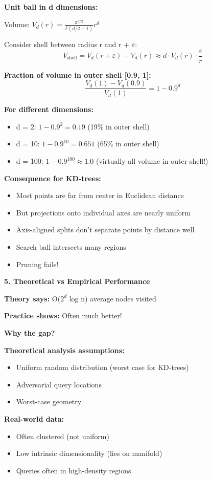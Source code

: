 \documentclass[12pt]{article}
\begin{document}
\begin{explanation}
\textbf{Unit ball in d dimensions:}

Volume: $V_d(r) = \frac{\pi^{d/2}}{\Gamma(d/2+1)} r^d$

Consider shell between radius r and r + $\varepsilon$:
\[
V_{\text{shell}} = V_d(r+\varepsilon) - V_d(r) \approx d \cdot V_d(r) \cdot \frac{\varepsilon}{r}
\]

\textbf{Fraction of volume in outer shell [0.9, 1]:}
\[
\frac{V_d(1) - V_d(0.9)}{V_d(1)} = 1 - 0.9^d
\]

\textbf{For different dimensions:}
\begin{itemize}
    \item d = 2: $1 - 0.9^2 = 0.19$ (19\% in outer shell)
    \item d = 10: $1 - 0.9^{10} = 0.651$ (65\% in outer shell)
    \item d = 100: $1 - 0.9^{100} \approx 1.0$ (virtually all volume in outer shell!)
\end{itemize}

\textbf{Consequence for KD-trees:}

\begin{itemize}
    \item Most points are far from center in Euclidean distance
    \item But projections onto individual axes are nearly uniform
    \item Axis-aligned splits don't separate points by distance well
    \item Search ball intersects many regions
    \item Pruning fails!
\end{itemize}

\textbf{5. Theoretical vs Empirical Performance}

\textbf{Theory says:} O($2^d$ log n) average nodes visited

\textbf{Practice shows:} Often much better!

\textbf{Why the gap?}

\textbf{Theoretical analysis assumptions:}
\begin{itemize}
    \item Uniform random distribution (worst case for KD-trees)
    \item Adversarial query locations
    \item Worst-case geometry
\end{itemize}

\textbf{Real-world data:}
\begin{itemize}
    \item Often clustered (not uniform)
    \item Low intrinsic dimensionality (lies on manifold)
    \item Queries often in high-density regions
\end{itemize}


\end{explanation}
\end{document}
